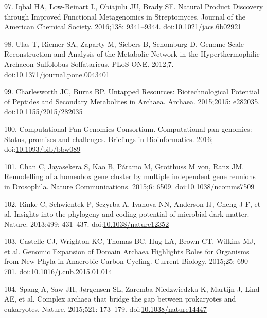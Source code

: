 \documentclass[12pt,twoside]{reedthesis}
\begin{document}
  \hypertarget{ref-iqbalux5fnaturalux5f2016}{}
  97. Iqbal HA, Low-Beinart L, Obiajulu JU, Brady SF. Natural Product
  Discovery through Improved Functional Metagenomics in Streptomyces.
  Journal of the American Chemical Society. 2016;138: 9341--9344.
  doi:\href{https://doi.org/10.1021/jacs.6b02921}{10.1021/jacs.6b02921}
  
  \hypertarget{ref-ulasux5fgenome-scaleux5f2012}{}
  98. Ulas T, Riemer SA, Zaparty M, Siebers B, Schomburg D. Genome-Scale
  Reconstruction and Analysis of the Metabolic Network in the
  Hyperthermophilic Archaeon Sulfolobus Solfataricus. PLoS ONE. 2012;7.
  doi:\href{https://doi.org/10.1371/journal.pone.0043401}{10.1371/journal.pone.0043401}
  
  \hypertarget{ref-charlesworthux5funtappedux5f2015}{}
  99. Charlesworth JC, Burns BP. Untapped Resources: Biotechnological
  Potential of Peptides and Secondary Metabolites in Archaea. Archaea.
  2015;2015: e282035.
  doi:\href{https://doi.org/10.1155/2015/282035}{10.1155/2015/282035}
  
  \hypertarget{ref-computationalux5fpan-genomicsux5fconsortiumux5fcomputationalux5f2016}{}
  100. Computational Pan-Genomics Consortium. Computational pan-genomics:
  Status, promises and challenges. Briefings in Bioinformatics. 2016;
  doi:\href{https://doi.org/10.1093/bib/bbw089}{10.1093/bib/bbw089}
  
  \hypertarget{ref-chanux5fremodellingux5f2015}{}
  101. Chan C, Jayasekera S, Kao B, Páramo M, Grotthuss M von, Ranz JM.
  Remodelling of a homeobox gene cluster by multiple independent gene
  reunions in Drosophila. Nature Communications. 2015;6: 6509.
  doi:\href{https://doi.org/10.1038/ncomms7509}{10.1038/ncomms7509}
  
  \hypertarget{ref-rinkeux5finsightsux5f2013}{}
  102. Rinke C, Schwientek P, Sczyrba A, Ivanova NN, Anderson IJ, Cheng
  J-F, et al. Insights into the phylogeny and coding potential of
  microbial dark matter. Nature. 2013;499: 431--437.
  doi:\href{https://doi.org/10.1038/nature12352}{10.1038/nature12352}
  
  \hypertarget{ref-castelleux5fgenomicux5f2015}{}
  103. Castelle CJ, Wrighton KC, Thomas BC, Hug LA, Brown CT, Wilkins MJ,
  et al. Genomic Expansion of Domain Archaea Highlights Roles for
  Organisms from New Phyla in Anaerobic Carbon Cycling. Current Biology.
  2015;25: 690--701.
  doi:\href{https://doi.org/10.1016/j.cub.2015.01.014}{10.1016/j.cub.2015.01.014}
  
  \hypertarget{ref-spangux5fcomplexux5f2015}{}
  104. Spang A, Saw JH, Jørgensen SL, Zaremba-Niedzwiedzka K, Martijn J,
  Lind AE, et al. Complex archaea that bridge the gap between prokaryotes
  and eukaryotes. Nature. 2015;521: 173--179.
  doi:\href{https://doi.org/10.1038/nature14447}{10.1038/nature14447}
  
\end{document}

